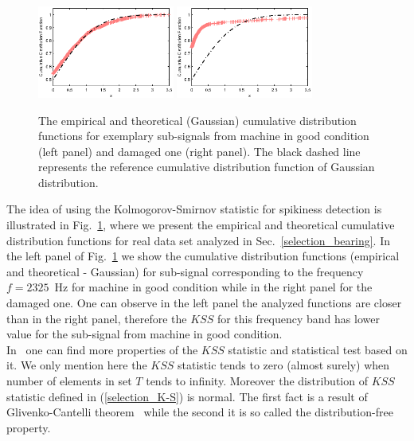 \begin{figure}[!ht]
\begin{center}
\includegraphics[width=0.4\textwidth]{methodology/selection/fig01aecdf_g}
\includegraphics[width=0.4\textwidth]{methodology/selection/fig01becdf_b}
\caption{The empirical and theoretical (Gaussian) cumulative distribution functions for exemplary sub-signals from machine in good condition (left panel) and damaged one (right panel). The black dashed line represents the reference cumulative distribution function of Gaussian distribution.}\label{selection_fig1}
\end{center}
\end{figure}
The idea of using the Kolmogorov-Smirnov statistic for spikiness detection is illustrated in Fig.~\ref{selection_fig1}, where we present the empirical and theoretical cumulative distribution functions for real data set analyzed in Sec.~\ref{selection_bearing}. In the left panel of Fig.~\ref{selection_fig1} we show the cumulative distribution functions (empirical and theoretical - Gaussian) for sub-signal corresponding to the frequency $f=2325$~Hz for machine in good condition while in the right panel for the damaged one. One can observe in the left panel the analyzed functions are closer than in the right panel, therefore the $KSS$ for this frequency band has lower value for the sub-signal from machine in good condition.\\ In~\cite{Stephens1979591,Burnecki2011293} one can find more properties of the $KSS$ statistic and statistical test based on it. We only mention here the $KSS$ statistic tends to zero (almost surely) when number of elements in set $T$ tends to infinity. Moreover the distribution of $KSS$ statistic defined in (\ref{selection_K-S}) is normal. The first fact is a result of Glivenko-Cantelli theorem~\cite{Tucker1959828} while the second it is so called the distribution-free property.\\

